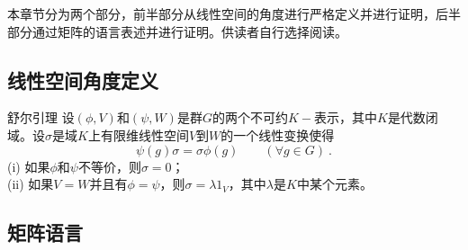 
\begin{issues}
\issueDraft
\issueNeedCite
\issueTODO
\issueMissDepend
\end{issues}


本章节分为两个部分，前半部分从线性空间的角度进行严格定义并进行证明，后半部分通过矩阵的语言表述并进行证明。供读者自行选择阅读。

\subsection{线性空间角度定义}


\begin{lemma}{舒尔引理}
设$(\phi,V)$和$(\psi,W)$是群$G$的两个不可约$K-$表示，其中$K$是代数闭域。设$\sigma$是域$K$上有限维线性空间$V$到$W$的一个线性变换使得
\begin{equation}\label{eq_Schlem_1}
\psi(g)\sigma =\sigma \phi(g) \qquad (\forall g \in G)~.
\end{equation}
(i) 如果$\phi$和$\psi$不等价，则$\sigma=0$； \\
(ii) 如果$V=W$并且有$\phi=\psi$，则$\sigma=\lambda1_V$，其中$\lambda$是$K$中某个元素。
\end{lemma}







\subsection{矩阵语言}

